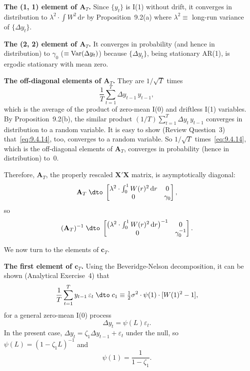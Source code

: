 \textbf{The (1, 1) element of $\mathbf{A}_T$.} Since $\{y_t\}$ is I(1) without drift, it converges in distribution to $\lambda^2 \cdot \int W^2\,\mathrm{d}r$ by Proposition~9.2(a) where $\lambda^2 \equiv$ long-run variance of
$\{\Delta y_t\}$.

\textbf{The (2, 2) element of $\mathbf{A}_T$.} It converges in probability (and hence in distribution)
to $\gamma_0$ ($\equiv \operatorname{Var}(\Delta y_t)$) because $\{\Delta y_t\}$, being stationary AR(1), is ergodic stationary with mean zero.

\textbf{The off-diagonal elements of $\mathbf{A}_T$.} They are $1/\sqrt{T}$ times
\begin{equation}
\label{eq:9.4.14}
\frac{1}{T}\sum_{t=1}^{T} \Delta y_{t-1}\, y_{t-1},
\end{equation}
which is the average of the product of zero-mean I(0) and driftless I(1) variables. By Proposition~9.2(b), the similar product $(1/T)\sum_{t=1}^{T} \Delta y_t\, y_{t-1}$ converges in distribution to a random variable. It is easy to show (Review Question~3) that~\eqref{eq:9.4.14}, too, converges to a random variable. So $1/\sqrt{T}$ times~\eqref{eq:9.4.14},
which is the off-diagonal elements of $\mathbf{A}_T$, converges in probability (hence in
distribution) to~0.

Therefore, $\mathbf{A}_T$, the properly rescaled $\mathbf{X}'\mathbf{X}$ matrix, is asymptotically diagonal:
\[
\mathbf{A}_T \;\dto\;
\begin{bmatrix}
\lambda^2 \cdot \int_0^1 W(r)^2\,\mathrm{d}r & 0 \\
0 & \gamma_0
\end{bmatrix},
\]
so
\begin{equation}
\label{eq:9.4.15}
(\mathbf{A}_T)^{-1} \;\dto\;
\begin{bmatrix}
\big(\lambda^2 \cdot \int_0^1 W(r)^2\,\mathrm{d}r\big)^{-1} & 0 \\
0 & \gamma_0^{-1}
\end{bmatrix}.
\end{equation}

We now turn to the elements of $\mathbf{c}_T$.

\textbf{The first element of $\mathbf{c}_T$.} Using the Beveridge-Nelson decomposition, it can be
shown (Analytical Exercise~4) that
\begin{equation}
\label{eq:9.4.16}
\frac{1}{T}\sum_{t=1}^{T} y_{t-1}\,\varepsilon_t
\;\dto\; c_1 \equiv \tfrac{1}{2}\sigma^2 \cdot \psi(1) \cdot [W(1)^2 - 1],
\end{equation}
for a general zero-mean I(0) process
\begin{equation}
\label{eq:9.4.17}
\Delta y_t = \psi(L)\varepsilon_t.
\end{equation}
In the present case, $\Delta y_t = \zeta_1 \Delta y_{t-1} + \varepsilon_t$ under the null, so $\psi(L) = (1 - \zeta_1 L)^{-1}$
and
\begin{equation}
\label{eq:9.4.18}
\psi(1) = \frac{1}{1 - \zeta_1}.
\end{equation}

